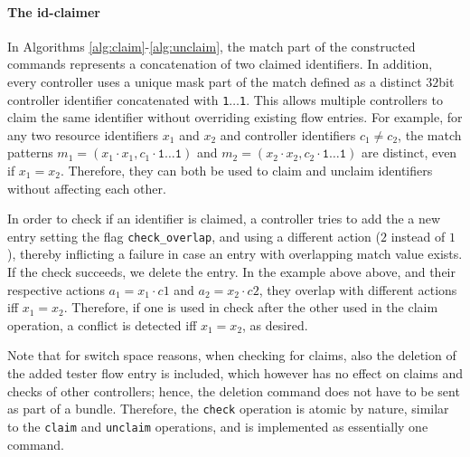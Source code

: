 \documentclass[conference]{sigcomm-alternate}
\newcommand{\concat}[0]{\cdot}
\newcommand{\claimcheck}{check\xspace}
\newcommand{\checko}{\texttt{check\_overlap}\xspace}
\begin{document}
\paragraph{The id-claimer}

In Algorithms \ref{alg:claim}-\ref{alg:unclaim}, 
the match part of the constructed commands represents a concatenation
of two claimed identifiers. 
In addition, every controller uses a unique mask part of the match
defined as a distinct $32$bit controller identifier concatenated with
\texttt{1$\ldots$1}.
This allows multiple controllers to claim the same identifier without
overriding existing flow entries.
%
For example, for any two resource identifiers $x_1$ and $x_2$ and controller identifiers $c_1\neq c_2$,
the match patterns $m_1=(x_1\concat x_1, c_1\concat \texttt{1$\ldots$1})$ and $ m_2=(x_2\concat x_2, c_2\concat \texttt{1$\ldots$1})$ are distinct,
even if $x_1=x_2$. 
Therefore, they can both be used to claim and unclaim identifiers without affecting each other.

In order to check if an identifier is claimed, a controller tries to add the
a new entry setting the flag \texttt{\checko}, and using a different
action ($2$ instead of $1$), 
thereby inflicting a failure in case an entry with overlapping match value exists.
If the check succeeds, we delete the entry. 
In the example above above,
and their respective actions $a_1=x_1\concat c1$ and $a_2=x_2\concat c2$,  they overlap
with different actions iff $x_1=x_2$. Therefore, if one is used in \claimcheck after the other used in the claim operation,
a conflict is detected iff $x_1=x_2$, as desired.

Note that for switch space reasons, when checking for claims, also the deletion of the added tester flow entry is included,
which however has no effect on claims and checks of other controllers; hence, the deletion command does not
have to be sent as part of a bundle. Therefore, the \texttt{\claimcheck} operation is atomic by nature,
similar to the \texttt{claim} and \texttt{unclaim} operations, and is implemented as essentially one command.

\end{document}
